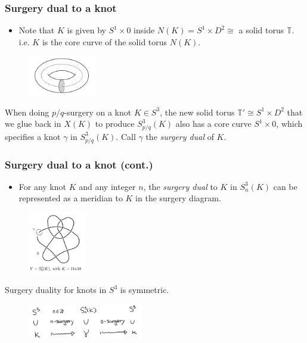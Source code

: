 \documentclass{beamer}
\theoremstyle{ex}
\theoremstyle{rem}
\begin{document}
	\begin{frame}
	\frametitle{Surgery dual to a knot}
		\begin{itemize}
		\item Note that $K$ is given by $S^1 \times {0}$ inside $N(K) = S^1 \times D^2 \cong$ a solid torus $\mathbb{T}$. i.e. $K$ is the core curve of the solid torus $N(K)$. 
		\end{itemize}
		\begin{figure}
			\centering
			\includegraphics[width=30mm]{core.png}
		\end{figure}
		\begin{definition}
		When doing $p/q$-surgery on a knot $K \in S^3$, the new solid torus $\mathbb{T'} \cong S^1 \times D^2$ that we glue back in $X(K)$ to produce $S^3_{p/q}(K)$ also has a core curve $S^1 \times {0}$, which specifies a knot $\gamma$ in $S^3_{p/q}(K)$. Call $\gamma$ the \textit{surgery dual} of $K$.
		\end{definition}		
	\end{frame}

	\begin{frame}
	\frametitle{Surgery dual to a knot (cont.)}
		\begin{itemize} 
		\item For any knot $K$ and any integer $n$, the \textit{surgery dual} to $K$ in $S^3_n(K)$ can be represented as a meridian to $K$ in the surgery diagram. 
		\end{itemize}
		\begin{figure}
			\centering
			\includegraphics[width=25mm]{dual.png}
		\end{figure}
		\begin{lemma}
		Surgery duality for knots in $S^3$ is symmetric. 
		\end{lemma}
		\begin{figure}
			\centering
			\includegraphics[width=50mm]{Symmetry.jpg}
		\end{figure}
	\end{frame}
\end{document}
